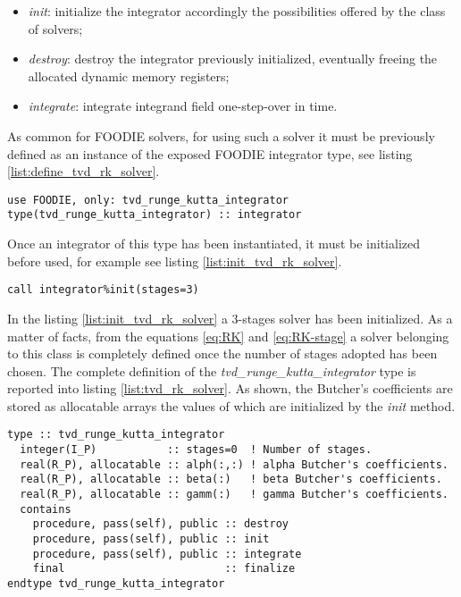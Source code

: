 \begin{itemize}
  \item \emph{init}: initialize the integrator accordingly the possibilities offered by the class of solvers;
  \item \emph{destroy}: destroy the integrator previously initialized, eventually freeing the allocated dynamic memory registers;
  \item \emph{integrate}: integrate integrand field one-step-over in time.
  \end{itemize}

As common for FOODIE solvers, for using such a solver it must be previously defined as an instance of the exposed FOODIE integrator type, see listing \ref{list:define_tvd_rk_solver}.

\begin{lstlisting}[firstnumber=1,style=code,caption={definition of an explicit TVD/SSP Runge-Kutta integrator},label={list:define_tvd_rk_solver}]
use FOODIE, only: tvd_runge_kutta_integrator
type(tvd_runge_kutta_integrator) :: integrator
\end{lstlisting}

Once an integrator of this type has been instantiated, it must be initialized before used, for example see listing \ref{list:init_tvd_rk_solver}.

\begin{lstlisting}[firstnumber=1,style=code,caption={example of initialization of an explicit TVD/SSP Runge-Kutta integrator},label={list:init_tvd_rk_solver}]
call integrator%init(stages=3)
\end{lstlisting}

In the listing \ref{list:init_tvd_rk_solver} a 3-stages solver has been initialized. As a matter of facts, from the equations \ref{eq:RK} and \ref{eq:RK-stage} a solver belonging to this class is completely defined once the number of stages adopted has been chosen. The complete definition of the \emph{tvd\_runge\_kutta\_integrator} type is reported into listing \ref{list:tvd_rk_solver}. As shown, the Butcher's coefficients are stored as allocatable arrays the values of which are initialized by the \emph{init} method.

\begin{lstlisting}[firstnumber=1,style=code,caption={definition of \emph{tvd\_runge\_kutta\_integrator} type},label={list:tvd_rk_solver}]
type :: tvd_runge_kutta_integrator
  integer(I_P)           :: stages=0  ! Number of stages.
  real(R_P), allocatable :: alph(:,:) ! alpha Butcher's coefficients.
  real(R_P), allocatable :: beta(:)   ! beta Butcher's coefficients.
  real(R_P), allocatable :: gamm(:)   ! gamma Butcher's coefficients.
  contains
    procedure, pass(self), public :: destroy
    procedure, pass(self), public :: init
    procedure, pass(self), public :: integrate
    final                         :: finalize
endtype tvd_runge_kutta_integrator
\end{lstlisting}

